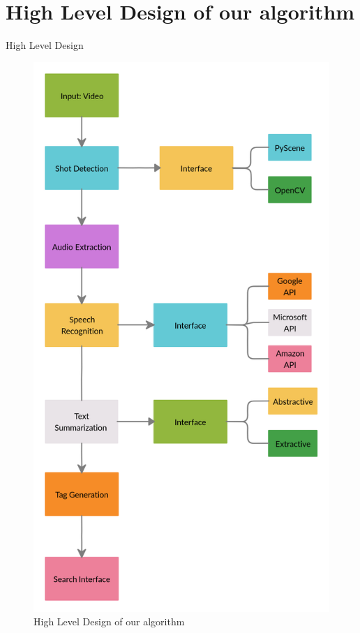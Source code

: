 \documentclass{beamer}
\begin{document}
\section{High Level Design of our algorithm}
\begin{frame}{High Level Design}
\begin{figure}
    \centering
    \includegraphics[scale=0.11]{Block Level Diagram.png}
    \caption{High Level Design of our algorithm}
    \label{fig:HLD}
\end{figure}
\end{frame}
\end{document}
